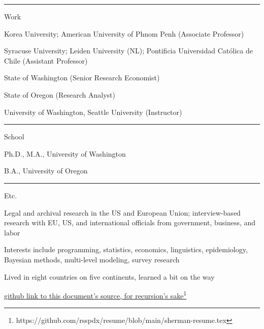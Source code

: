 \documentclass[letterpaper, english, 11pt]{article}
\newenvironment{packed_itemize}{
	\begin{itemize}
		\setlength{\itemsep}{1pt}
		\setlength{\parskip}{2pt}
		\setlength{\parsep}{2pt}
	} {\end{itemize}
}
\begin{document}
\vspace{6pt}
\hrule

Work

\begin{footnotesize}
	\begin{packed_itemize}
		\item Korea University; American University of Phnom Penh (Associate Professor)
		\item Syracuse University; Leiden University (NL); Pontificia Universidad Cat{\'o}lica de Chile (Assistant Professor)
		\item State of Washington (Senior Research Economist)
		\item State of Oregon (Research Analyst)
		\item University of Washington, Seattle University (Instructor)
	\end{packed_itemize}
\end{footnotesize}

\vspace{6pt}
\hrule

School

\begin{footnotesize}
	\begin{packed_itemize}
		\item Ph.D., M.A., University of Washington
		\item B.A., University of Oregon
	\end{packed_itemize}
\end{footnotesize}

\vspace{6pt}
\hrule

Etc.

\begin{footnotesize}
	\begin{packed_itemize}
		\item Legal and archival research in the US and European Union; interview-based research with EU, US, and international officials from government, business, and labor 
		\item Interests include programming, statistics, economics, linguistics, epidemiology, Bayesian methods, multi-level modeling, survey research
		\item Lived in eight countries on five continents, learned a bit on the way
		\item \href{https://github.com/rsspdx/resume/blob/main/sherman-resume.tex}{github link to this document's source, for recursion's sake\footnote{https://github.com/rsspdx/resume/blob/main/sherman-resume.tex}}
	\end{packed_itemize}
\end{footnotesize} 
\end{document}
